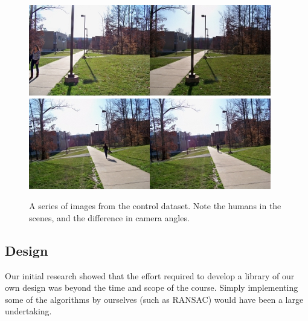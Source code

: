 \documentclass[12pt]{amsart}
\begin{document}
\begin{figure}[htbp]
\begin{center}
\includegraphics[scale =.5]{rptImages/100_3066.jpg}\includegraphics[scale =.5]{rptImages/100_3067.jpg}\includegraphics[scale =.5]{rptImages/100_3068.jpg}\includegraphics[scale =.5]{rptImages/100_3069.jpg}
\caption{A series of images from the control dataset. Note the humans in the scenes, and the difference in camera angles.}
\label{default}
\end{center}
\end{figure}

\subsection{Design}
Our initial research showed that the effort required to develop a library of our own design was beyond the time and scope of the course. Simply implementing some of the algorithms by ourselves (such as RANSAC) would have been a large undertaking.
\end{document}
